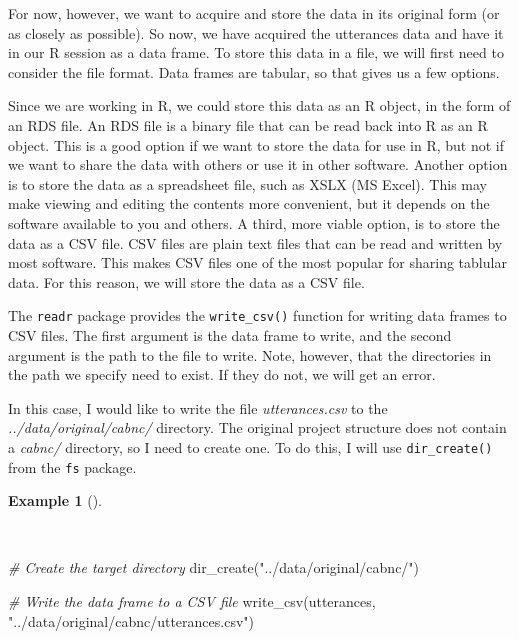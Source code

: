 \documentclass[
  letterpaper,
]{latex/krantz}
\newenvironment{Shaded}{\begin{snugshade}}{\end{snugshade}}
\newcommand{\CommentTok}[1]{\textcolor[rgb]{0.00,0.00,0.00}{\textit{#1}}}
\newcommand{\FunctionTok}[1]{\textcolor[rgb]{0.00,0.00,0.00}{#1}}
\newcommand{\NormalTok}[1]{\textcolor[rgb]{0.00,0.00,0.00}{#1}}
\newcommand{\StringTok}[1]{\textcolor[rgb]{0.00,0.00,0.00}{#1}}
\theoremstyle{definition}
\newtheorem{example}{Example}[chapter]
\theoremstyle{remark}
\begin{document}
For now, however, we want to acquire and store the data in its original
form (or as closely as possible). So now, we have acquired the
utterances data and have it in our R session as a data frame. To store
this data in a file, we will first need to consider the file format.
Data frames are tabular, so that gives us a few options.

Since we are working in R, we could store this data as an R object, in
the form of an RDS file. An RDS file is a binary file that can be read
back into R as an R object. This is a good option if we want to store
the data for use in R, but not if we want to share the data with others
or use it in other software. Another option is to store the data as a
spreadsheet file, such as XSLX (MS Excel). This may make viewing and
editing the contents more convenient, but it depends on the software
available to you and others. A third, more viable option, is to store
the data as a CSV file. CSV files are plain text files that can be read
and written by most software. This makes CSV files one of the most
popular for sharing tablular data. For this reason, we will store the
data as a CSV file.

The \texttt{readr} package provides the \texttt{write\_csv()} function
for writing data frames to CSV files. The first argument is the data
frame to write, and the second argument is the path to the file to
write. Note, however, that the directories in the path we specify need
to exist. If they do not, we will get an error.

In this case, I would like to write the file \emph{utterances.csv} to
the \emph{../data/original/cabnc/} directory. The original project
structure does not contain a \emph{cabnc/} directory, so I need to
create one. To do this, I will use \texttt{dir\_create()} from the
\texttt{fs} package.

\begin{example}[]\protect\hypertarget{exm-ad-write-csv}{}\label{exm-ad-write-csv}

~

\begin{Shaded}
\begin{Highlighting}[]
\CommentTok{\# Create the target directory}
\FunctionTok{dir\_create}\NormalTok{(}\StringTok{"../data/original/cabnc/"}\NormalTok{)}

\CommentTok{\# Write the data frame to a CSV file}
\FunctionTok{write\_csv}\NormalTok{(utterances, }\StringTok{"../data/original/cabnc/utterances.csv"}\NormalTok{)}
\end{Highlighting}
\end{Shaded}

\end{example}
\end{document}
